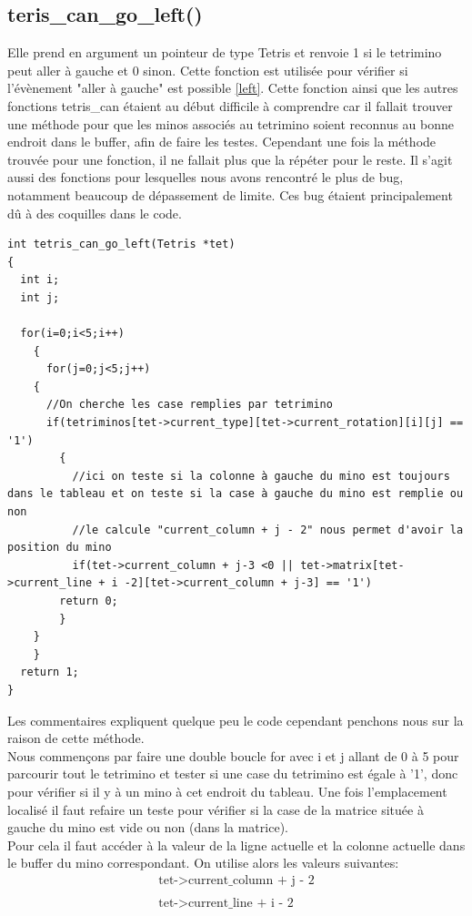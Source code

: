 \documentclass[a4paper,10p]{report}
\begin{document}
\subsection{teris\_can\_go\_left()}
Elle prend en argument un pointeur de type Tetris et renvoie 1 si le tetrimino peut aller à gauche et 0 sinon. Cette fonction est utilisée pour vérifier si l'évènement "aller à gauche" est possible \ref{left}. Cette fonction ainsi que les autres fonctions tetris\_can étaient au début difficile à comprendre car il fallait trouver une méthode pour que les minos associés au tetrimino soient reconnus au bonne endroit dans le buffer, afin de faire les testes. Cependant une fois la méthode trouvée pour une fonction, il ne fallait plus que la répéter pour le reste. Il s'agit aussi des fonctions pour lesquelles nous avons rencontré le plus de bug, notamment beaucoup de dépassement de limite. Ces bug étaient principalement dû à des coquilles dans le code.
\label{tetris_can_go_left}
\begin{lstlisting}
int tetris_can_go_left(Tetris *tet)
{
  int i;
  int j;

  for(i=0;i<5;i++)
    {
      for(j=0;j<5;j++)
	{
	  //On cherche les case remplies par tetrimino
	  if(tetriminos[tet->current_type][tet->current_rotation][i][j] == '1')
	    {
	      //ici on teste si la colonne à gauche du mino est toujours dans le tableau et on teste si la case à gauche du mino est remplie ou non
	      //le calcule "current_column + j - 2" nous permet d'avoir la position du mino
	      if(tet->current_column + j-3 <0 || tet->matrix[tet->current_line + i -2][tet->current_column + j-3] == '1')
		return 0;
	    }
	}
    }
  return 1;
}
\end{lstlisting}
Les commentaires expliquent quelque peu le code cependant penchons nous sur la raison de cette méthode.
\\Nous commençons par faire une double boucle for avec i et j allant de 0 à 5 pour parcourir tout le tetrimino et tester si une case du tetrimino est égale à '1', donc pour vérifier si il y à un mino à cet endroit du tableau. Une fois l'emplacement localisé il faut refaire un teste pour vérifier si la case de la matrice située à gauche du mino est vide ou non (dans la matrice).
\\Pour cela il faut accéder à la valeur de la ligne actuelle et la colonne actuelle dans le buffer du mino correspondant. On utilise alors les valeurs suivantes:
\begin{equation*}
\begin{split}
    \text{tet->current\_column + j - 2}
    \\\\
    \text{tet->current\_line + i - 2}
\end{split}
\end{equation*}
\end{document}
